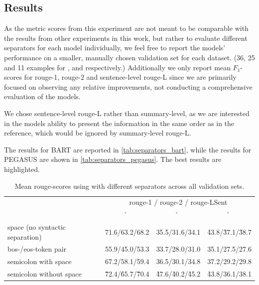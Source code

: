 \subsection{Results}

As the metric scores from this experiment are not meant to be comparable with the results from other experiments in this work,
but rather to evaluate different separators for each model individually,
we feel free to report the models' performance on a smaller, manually chosen validation set for each dataset.
(36, 25 and 11 examples for \logsummary{}, \hadoop{} and \telco{} respectively.)
Additionally we only report mean \(F_1\)-scores for \acs*{rouge}-1, \acs*{rouge}-2 and sentence-level \acs*{rouge}-L
since we are primarily focused on observing any relative improvements,
not conducting a comprehensive evaluation of the models.

We chose sentence-level \acs*{rouge}-L rather than summary-level,
as we are interested in the models ability to present the information in the same order as in the reference,
which would be ignored by summary-level \acs*{rouge}-L.

The results for BART are reported in \autoref{tab:separators_bart},
while the results for PEGASUS are shown in \autoref{tab:separators_pegasus}.
The best results are highlighted.

\begin{table}[htbp]
\centering
\footnotesize
\begin{tabular}{lccc}
                                 & \multicolumn{3}{c}{\scriptsize{}\acs*{rouge}-1 / \acs*{rouge}-2 / \acs*{rouge}-LSent}\\
                                 & \h{\logsummary{}}          & \h{\hadoop{}}              & \h{\telco{}}\\
\midrule
space (no syntactic separation)  & 71.6/63.2/68.2             & 35.5/31.6/34.1             & \h{43.8}/\h{37.1}/\h{38.7}\\
\acs{bos}-/\acs{eos}-token pair  & 55.9/45.0/53.3             & 33.7/28.0/31.0             & 35.1/27.5/27.6\\
semicolon with space             & 67.2/58.1/59.4             & 36.5/30.1/34.8             & 37.2/29.2/29.8\\
semicolon without space          & \h{72.4}/\h{65.7}/\h{70.4} & \h{47.6}/\h{40.2}/\h{45.2} & \h{43.8}/36.1/38.1\\
\end{tabular}
\caption{Mean \acs*{rouge}-scores using  with different separators across all validation sets.}
\label{tab:separators_bart}
\end{table}

